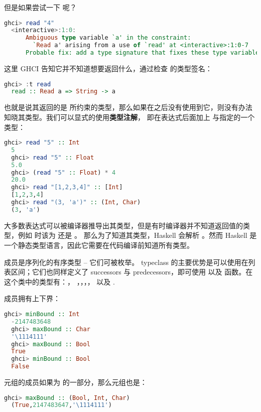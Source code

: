 \documentclass[./main.tex]{subfiles}
\begin{document}
但是如果尝试一下  呢？

\begin{lstlisting}[language=Haskell]
  ghci> read "4"
  <interactive>:1:0:
      Ambiguous type variable `a' in the constraint:
        `Read a' arising from a use of `read' at <interactive>:1:0-7
      Probable fix: add a type signature that fixes these type variable(s)
\end{lstlisting}

这里 GHCI 告知它并不知道想要返回什么，通过检查  的类型签名：

\begin{lstlisting}[language=Haskell]
  ghci> :t read
  read :: Read a => String -> a
\end{lstlisting}

也就是说其返回的是  所约束的类型，那么如果在之后没有使用到它，则没有办法知晓其类型。我们可以显式的使用\textbf{类型注解}，
即在表达式后面加上 \acode{::} 与指定的一个类型：

\begin{lstlisting}[language=Haskell]
  ghci> read "5" :: Int
  5
  ghci> read "5" :: Float
  5.0
  ghci> (read "5" :: Float) * 4
  20.0
  ghci> read "[1,2,3,4]" :: [Int]
  [1,2,3,4]
  ghci> read "(3, 'a')" :: (Int, Char)
  (3, 'a')
\end{lstlisting}

大多数表达式可以被编译器推导出其类型，但是有时编译器并不知道返回值的类型，例如  时该为  还是 。
那么为了知道其类型，Haskell 会解析 。然而 Haskell 是一个静态类型语言，因此它需要在代码编译前知道所有类型。

 成员是序列化的有序类型 -- 它们可被枚举。 typeclass 的主要优势是可以使用在列表区间；它们也同样定义了
successors 与 predecessors，即可使用  以及  函数。在这个类中的类型有：\acode{()}，
，，，， 以及 .

 成员拥有上下界：

\begin{lstlisting}[language=Haskell]
  ghci> minBound :: Int
  -2147483648
  ghci> maxBound :: Char
  '\1114111'
  ghci> maxBound :: Bool
  True
  ghci> minBound :: Bool
  False
\end{lstlisting}

元组的成员如果为  的一部分，那么元组也是：

\begin{lstlisting}[language=Haskell]
  ghci> maxBound :: (Bool, Int, Char)
  (True,2147483647,'\1114111')
\end{lstlisting}
\end{document}
